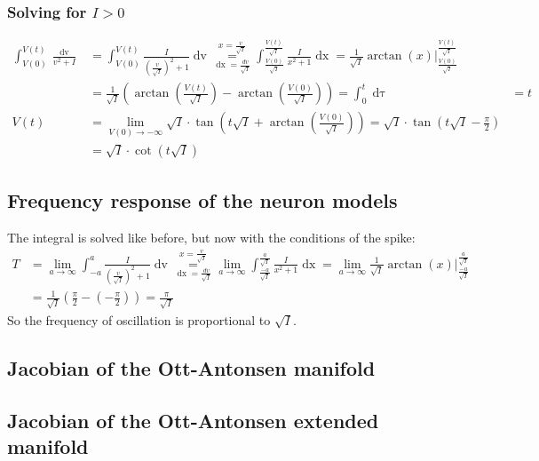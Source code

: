 \subsubsection{Solving for \texorpdfstring{$I > 0$}{TEXT}}
\begin{align*}
\int_{V(0)}^{V(t)} \frac{\mathop{dv}}{v^2 + I} &= \int_{V(0)}^{V(t)} \frac{I}{\left(\frac{v}{\sqrt{I}}\right)^2 + 1} \mathop{dv} 
\overset{x = \frac{v}{\sqrt{I}}}{\underset{\mathop{dx} = \frac{dv}{\sqrt{I}}}{=}} 
\int_{\frac{V(0)}{\sqrt{I}}}^{\frac{V(t)}{\sqrt{I}}} \frac{I}{x^2 + 1} \mathop{dx}= \frac{1}{\sqrt{I}} \arctan(x) \Big \rvert_{\frac{V(0)}{\sqrt{I}}}^{\frac{V(t)}{\sqrt{I}}} \\
&= \frac{1}{\sqrt{I}} \left( \arctan \left( \frac{V(t)}{\sqrt{I}} \right) - \arctan \left( \frac{V(0)}{\sqrt{I}} \right) \right) = 
\int_0^t \mathop{d\tau} &= t \\
V(t) &= \lim_{V(0) \rightarrow -\infty} \sqrt{I} \cdot \tan \left( t \sqrt{I} + \arctan \left( \frac{V(0)}{\sqrt{I}} \right) \right) = \sqrt{I} \cdot \tan \left( t \sqrt{I} - \frac{\pi}{2} \right) \\
&=  \sqrt{I} \cdot \cot \left( t \sqrt{I} \right) 
\end{align*}


\subsection{Frequency response of the neuron models} \label{app:ThetaModelFrequencyResponse}
The integral is solved like before, but now with the conditions of the spike:
\begin{align*}
T &= \lim_{a \rightarrow \infty} \int_{-a}^{a} \frac{I}{\left(\frac{v}{\sqrt{I}}\right)^2 + 1} \mathop{dv} 
\overset{x = \frac{v}{\sqrt{I}}}{\underset{\mathop{dx} = \frac{dv}{\sqrt{I}}}{=}} 
\lim_{a \rightarrow \infty} \int_{\frac{-a}{\sqrt{I}}}^{\frac{a}{\sqrt{I}}} \frac{I}{x^2 + 1} \mathop{dx}
= \lim_{a \rightarrow \infty} \frac{1}{\sqrt{I}} \arctan(x) \Big \rvert_{\frac{-a}{\sqrt{I}}}^{\frac{a}{\sqrt{I}}} \\
&= \frac{1}{\sqrt{I}} \left( \frac{\pi}{2} - \left( - \frac{\pi}{2} \right) \right)
= \frac{\pi}{\sqrt{I}}
\end{align*}
So the frequency of oscillation is proportional to $\sqrt{I}$. 

\subsection{Jacobian of the Ott-Antonsen manifold}
\subsection{Jacobian of the Ott-Antonsen extended manifold}







